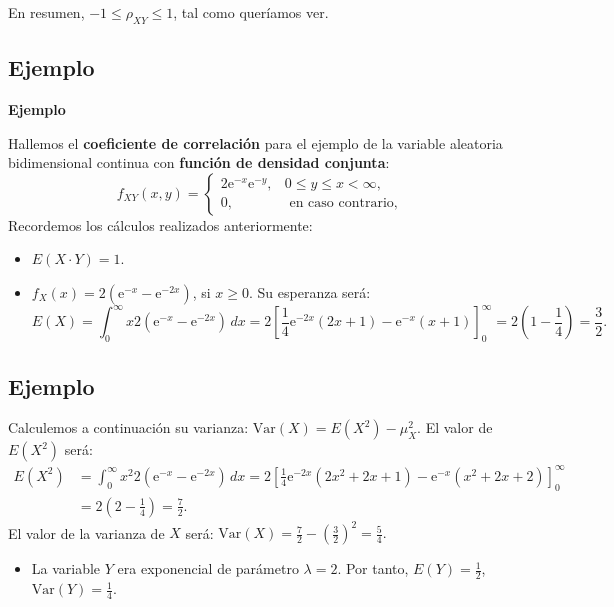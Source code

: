 \documentclass[]{book}
\providecommand{\tightlist}{%
  \setlength{\itemsep}{0pt}\setlength{\parskip}{0pt}}
\begin{document}
En resumen, \(-1\leq\rho_{XY}\leq 1\), tal como queríamos ver.

\hypertarget{ejemplo-62}{%
\subsection{Ejemplo}\label{ejemplo-62}}

\textbf{Ejemplo}

Hallemos el \textbf{coeficiente de correlación} para el ejemplo de la variable aleatoria bidimensional continua con \textbf{función de densidad conjunta}:
\[
f_{XY}(x,y)=\begin{cases}
2 \mathrm{e}^{-x}\mathrm{e}^{-y}, & 0\leq y\leq x < \infty,\\
0, & \mbox{ en caso contrario,}
\end{cases}
\]
Recordemos los cálculos realizados anteriormente:

\begin{itemize}
\item
  \(E(X\cdot Y)=1.\)
\item
  \(f_X(x)=2\left(\mathrm{e}^{-x}-\mathrm{e}^{-2x}\right)\), si \(x\geq 0\). Su esperanza será:
  \[
  E(X)=\int_0^\infty x 2\left(\mathrm{e}^{-x}-\mathrm{e}^{-2x}\right)\, dx=2 \left[\frac{1}{4} \mathrm{e}^{-2 x} (2 x+1)-\mathrm{e}^{-x}(x+1)\right]_0^\infty = 2\left(1-\frac{1}{4}\right)=\frac{3}{2}.
  \]
\end{itemize}

\hypertarget{ejemplo-63}{%
\subsection{Ejemplo}\label{ejemplo-63}}

Calculemos a continuación su varianza: \(\mathrm{Var}(X)=E\left(X^2\right)-\mu_X^2\). El valor de \(E\left(X^2\right)\) será:
\[
\begin{array}{rl}
E\left(X^2\right) & =\int_0^\infty x^2 2\left(\mathrm{e}^{-x}-\mathrm{e}^{-2x}\right)\, dx=2 \left[\frac{1}{4} \mathrm{e}^{-2 x}  (2x^2+2x+1)- \mathrm{e}^{-x} (x^2+2x+2)\right]_0^\infty \\ & = 2\left(2-\frac{1}{4}\right)=\frac{7}{2}.
\end{array}
\]
El valor de la varianza de \(X\) será: \(\mathrm{Var}(X)=\frac{7}{2}-\left(\frac{3}{2}\right)^2 = \frac{5}{4}.\)

\begin{itemize}
\tightlist
\item
  La variable \(Y\) era exponencial de parámetro \(\lambda =2\). Por tanto, \(E(Y)=\frac{1}{2}\), \(\mathrm{Var}(Y)=\frac{1}{4}\).
\end{itemize}
\end{document}
